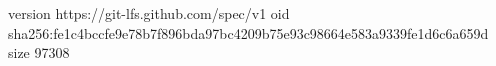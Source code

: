 version https://git-lfs.github.com/spec/v1
oid sha256:fe1c4bccfe9e78b7f896bda97bc4209b75e93c98664e583a9339fe1d6c6a659d
size 97308
